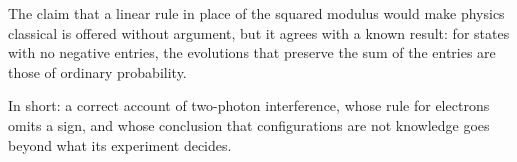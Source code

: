 \begin{afterword}
The claim that a linear rule in place of the squared modulus would make physics classical is offered without argument, but it agrees with a known result: for states with no negative entries, the evolutions that preserve the sum of the entries are those of ordinary probability.

In short: a correct account of two-photon interference, whose rule for electrons omits a sign, and whose conclusion that configurations are not knowledge goes beyond what its experiment decides.
\end{afterword}
